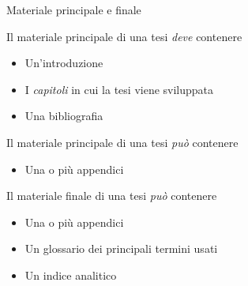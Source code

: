 \documentclass{beamer}
\begin{document}
\begin{frame}{Materiale principale e finale}

\begin{block}{Il materiale principale di una tesi \textit{deve} contenere}
\begin{itemize}
\item Un'introduzione
\item I \textit{capitoli} in cui la tesi viene sviluppata
\item Una bibliografia
\end{itemize}
\end{block}

\begin{block}{Il materiale principale di una tesi \textit{pu\`o} contenere}
\begin{itemize}
\item Una o pi\`u appendici
\end{itemize}
\end{block}

\begin{block}{Il materiale finale di una tesi \textit{pu\`o} contenere}
\begin{itemize}
\item Una o pi\`u appendici
\item Un glossario dei principali termini usati
\item Un indice analitico
\end{itemize}
\end{block}

\end{frame}
\end{document}
